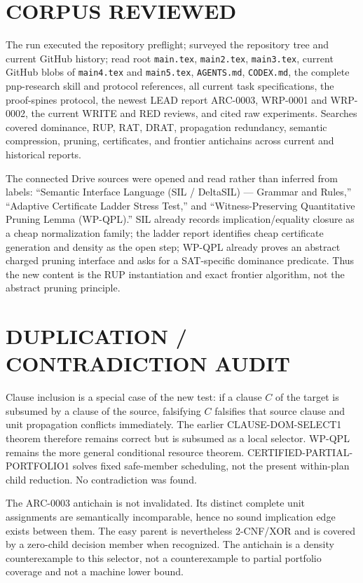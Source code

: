 \documentclass[11pt]{article}
\begin{document}
\section*{CORPUS REVIEWED}
The run executed the repository preflight; surveyed the repository tree and
current GitHub history; read root \texttt{main.tex}, \texttt{main2.tex},
\texttt{main3.tex}, current GitHub blobs of \texttt{main4.tex} and
\texttt{main5.tex}, \texttt{AGENTS.md}, \texttt{CODEX.md}, the complete
pnp-research skill and protocol references, all current task specifications,
the proof-spines protocol, the newest LEAD report ARC-0003, WRP-0001 and
WRP-0002, the current WRITE and RED reviews, and cited raw experiments.
Searches covered dominance, RUP, RAT, DRAT, propagation redundancy, semantic
compression, pruning, certificates, and frontier antichains across current
and historical reports.

The connected Drive sources were opened and read rather than inferred from
labels: ``Semantic Interface Language (SIL / DeltaSIL) --- Grammar and
Rules,'' ``Adaptive Certificate Ladder Stress Test,'' and
``Witness-Preserving Quantitative Pruning Lemma (WP-QPL).''  SIL already
records implication/equality closure as a cheap normalization family; the
ladder report identifies cheap certificate generation and density as the
open step; WP-QPL already proves an abstract charged pruning interface and
asks for a SAT-specific dominance predicate.  Thus the new content is the
RUP instantiation and exact frontier algorithm, not the abstract pruning
principle.

\section*{DUPLICATION / CONTRADICTION AUDIT}
Clause inclusion is a special case of the new test: if a clause $C$ of the
target is subsumed by a clause of the source, falsifying $C$ falsifies that
source clause and unit propagation conflicts immediately.  The earlier
CLAUSE-DOM-SELECT1 theorem therefore remains correct but is subsumed as a
local selector.  WP-QPL remains the more general conditional resource
theorem.  CERTIFIED-PARTIAL-PORTFOLIO1 solves fixed safe-member scheduling,
not the present within-plan child reduction.  No contradiction was found.

The ARC-0003 antichain is not invalidated.  Its distinct complete unit
assignments are semantically incomparable, hence no sound implication edge
exists between them.  The easy parent is nevertheless 2-CNF/XOR and is
covered by a zero-child decision member when recognized.  The antichain is a
density counterexample to this selector, not a counterexample to partial
portfolio coverage and not a machine lower bound.
\end{document}
